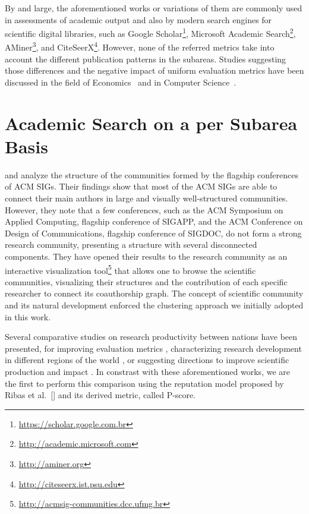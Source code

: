 \documentclass[msc]{ppgccufmg}
\begin{document}
By and large, the aforementioned works or variations of them are commonly used in assessments of academic output and also by modern search engines for scientific digital libraries, such as Google Scholar\footnote{\url{https://scholar.google.com.br}}, Microsoft Academic Search\footnote{\url{http://academic.microsoft.com}}, AMiner\footnote{\url{http://aminer.org}}, %
and CiteSeerX\footnote{\url{http://citeseerx.ist.psu.edu}}.  
However, none of the referred metrics take into account the different publication patterns in the subareas. Studies suggesting those differences and the negative impact of uniform evaluation metrics have been discussed in the field of Economics~\citep{kapeller10, lee10} and in Computer Science~\citep{hoonlor13, laendersigs15, lima2013jcdl}.

\section{Academic Search on a per Subarea Basis}\label{sec:rwsubarea}

\cite{alves} and \cite{laendersigs15} analyze the structure of the communities formed by the flagship conferences of ACM SIGs. Their findings show that most of the ACM SIGs are able to connect their main authors in large and visually well-structured communities. However, they note that a few conferences, such as the ACM Symposium on Applied Computing, flagship conference of SIGAPP, and the ACM Conference on Design of Communications, flagship conference of SIGDOC, do not form a strong research community, presenting a structure with several disconnected components. They have opened their results to the research community as an interactive visualization tool\footnote{\url{http://acmsig-communities.dcc.ufmg.br}} that allows one to browse the scientific communities, visualizing their structures and the contribution of each specific researcher to connect its coauthorship graph. The concept of scientific community and its natural development enforced the clustering approach we initially adopted in this work.

Several comparative studies on research productivity between nations have been presented, for improving evaluation metrics \citep{laender2008}, characterizing research development in different regions of the world \citep{menezes09}, or suggesting directions to improve scientific production and impact \citep{wainer09}. In constrast with these aforementioned works, we are the first to perform this comparison using the reputation model proposed by Ribas et al.~[\citeyear{ribas2015random}] and its derived metric, called P-score. %
\end{document}
